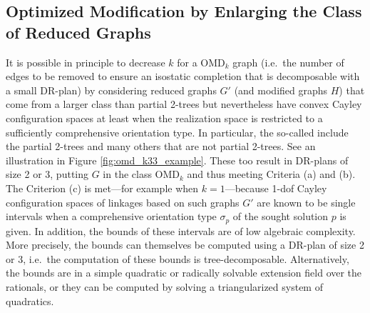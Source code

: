 \subsection{Optimized Modification by Enlarging the Class of Reduced
Graphs}
\label{sec:tdecomp}
%
It is possible in principle to decrease $k$ for a OMD$_k$ graph (i.e.\ the number of edges to be removed to ensure an isostatic completion that is decomposable with a small DR-plan) by considering reduced graphs $G'$ (and modified graphs $H$) that come from a larger class than partial 2-trees but nevertheless have convex Cayley configuration spaces at least when the realization space is restricted to a sufficiently comprehensive orientation type. In particular, the so-called  \cite{sitharam2011cayleyI,sitharam2011cayleyII} include the partial 2-trees and many others that are not partial 2-trees. See an illustration in Figure \ref{fig:omd_k33_example}. These too result in DR-plans of size 2 or 3, putting $G$ in the class OMD$_k$ and thus meeting Criteria (a) and (b). The Criterion (c) is met---for example when $k=1$---because 1-dof Cayley configuration spaces of linkages based on such graphs $G'$ are known to be single intervals when a comprehensive orientation type $\sigma_p$ of the sought solution $p$ is given. In addition, the bounds of these intervals are of low algebraic complexity. More precisely, the bounds  can themselves be computed using a DR-plan of size 2 or 3, i.e.\ the computation of these bounds is tree-decomposable. Alternatively, the bounds are in a simple quadratic or radically solvable extension field over the rationals, or they can be computed by solving a triangularized system of quadratics.
